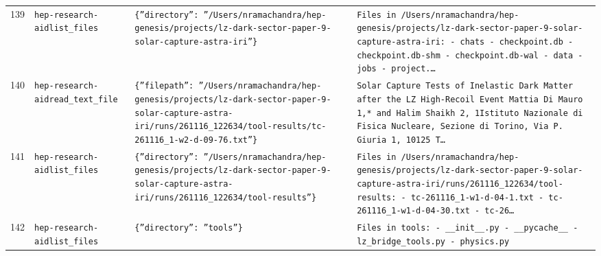 \documentclass[11pt,a4paper]{article}
\begin{document}
\begin{longtable}{@{}p{}p{}p{}p{}@{}}
139 & \texttt{hep-research-aid}\newline\texttt{list\_\allowbreak{}files} & \texttt{\{''directory'':\allowbreak{} ''/\allowbreak{}Users/\allowbreak{}nramachandra/\allowbreak{}hep-genesis/\allowbreak{}projects/\allowbreak{}lz-dark-sector-paper-9-solar-capture-astra-iri''\}\allowbreak{}} & \texttt{Files in /\allowbreak{}Users/\allowbreak{}nramachandra/\allowbreak{}hep-genesis/\allowbreak{}projects/\allowbreak{}lz-dark-sector-paper-9-solar-capture-astra-iri:\allowbreak{}   - chats   - checkpoint.db   - checkpoint.db-shm   - checkpoint.db-wal   - data   - jobs   - project.\ldots{}\allowbreak{}} \\
140 & \texttt{hep-research-aid}\newline\texttt{read\_\allowbreak{}text\_\allowbreak{}file} & \texttt{\{''filepath'':\allowbreak{} ''/\allowbreak{}Users/\allowbreak{}nramachandra/\allowbreak{}hep-genesis/\allowbreak{}projects/\allowbreak{}lz-dark-sector-paper-9-solar-capture-astra-iri/\allowbreak{}runs/\allowbreak{}261116\_\allowbreak{}122634/\allowbreak{}tool-results/\allowbreak{}tc-261116\_\allowbreak{}1-w2-d-09-76.txt''\}\allowbreak{}} & \texttt{Solar Capture Tests of Inelastic Dark Matter after the LZ High-Recoil Event Mattia Di Mauro 1,\allowbreak{}* and Halim Shaikh 2,\allowbreak{}\dag{}\allowbreak{} 1Istituto Nazionale di Fisica Nucleare,\allowbreak{} Sezione di Torino,\allowbreak{} Via P. Giuria 1,\allowbreak{} 10125 T\ldots{}\allowbreak{}} \\
141 & \texttt{hep-research-aid}\newline\texttt{list\_\allowbreak{}files} & \texttt{\{''directory'':\allowbreak{} ''/\allowbreak{}Users/\allowbreak{}nramachandra/\allowbreak{}hep-genesis/\allowbreak{}projects/\allowbreak{}lz-dark-sector-paper-9-solar-capture-astra-iri/\allowbreak{}runs/\allowbreak{}261116\_\allowbreak{}122634/\allowbreak{}tool-results''\}\allowbreak{}} & \texttt{Files in /\allowbreak{}Users/\allowbreak{}nramachandra/\allowbreak{}hep-genesis/\allowbreak{}projects/\allowbreak{}lz-dark-sector-paper-9-solar-capture-astra-iri/\allowbreak{}runs/\allowbreak{}261116\_\allowbreak{}122634/\allowbreak{}tool-results:\allowbreak{}   - tc-261116\_\allowbreak{}1-w1-d-04-1.txt   - tc-261116\_\allowbreak{}1-w1-d-04-30.txt   - tc-26\ldots{}\allowbreak{}} \\
142 & \texttt{hep-research-aid}\newline\texttt{list\_\allowbreak{}files} & \texttt{\{''directory'':\allowbreak{} ''tools''\}\allowbreak{}} & \texttt{Files in tools:\allowbreak{}   - \_\allowbreak{}\_\allowbreak{}init\_\allowbreak{}\_\allowbreak{}.py   - \_\allowbreak{}\_\allowbreak{}pycache\_\allowbreak{}\_\allowbreak{}   - lz\_\allowbreak{}bridge\_\allowbreak{}tools.py   - physics.py} \\

\end{longtable}
\end{document}
